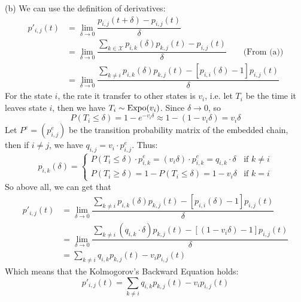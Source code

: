 \begin{homeworkProblem}
(b) We can use the definition of derivatives:
\begin{align*}
p'_{i,j}(t) &= \lim_{\delta\to 0}\dfrac{p_{i,j}(t+\delta)-p_{i,j}(t)}{\delta} \\
&= \lim_{\delta\to 0}\dfrac{\sum\limits_{k\in\mathcal{X}}p_{i,k}(\delta)p_{k,j}(t)-p_{i,j}(t)}{\delta} \qquad\text{(From (a))} \\
&= \lim_{\delta\to 0}\dfrac{\sum\limits_{k\neq i}p_{i,k}(\delta)p_{k,j}(t)-\left[p_{i,i}(\delta)-1\right]p_{i,j}(t)}{\delta}
\end{align*}
For the state $i$, the rate it transfer to other states is $v_i$, i.e. let $T_i$ be the time it leaves state $i$, then we have $T_i\sim\operatorname{Expo}(v_i)$. Since $\delta\to 0$, so
$$P(T_i\leq\delta)=1-e^{-v_i\delta}\approx 1-(1-v_i\delta)=v_i\delta$$
Let $P^e=\left(p_{i,j}^e\right)$ be the transition probability matrix of the embedded chain, then if $i\neq j$, we have $q_{i,j}=v_i\cdot p_{i,j}^e$. Thus:
$$p_{i,k}(\delta) = \begin{cases}
P(T_i\leq\delta)\cdot p_{i,k}^e = (v_i\delta)\cdot p_{i,k}^e = q_{i,k}\cdot\delta & \text{if } k\neq i \\
P(T_i\geq\delta) = 1 - P(T_i\leq\delta) = 1 - v_i\delta & \text{if } k=i
\end{cases}$$
So above all, we can get that
\begin{align*}
p'_{i,j}(t) &= \lim_{\delta\to 0}\dfrac{\sum\limits_{k\neq i}p_{i,k}(\delta)p_{k,j}(t)-\left[p_{i,i}(\delta)-1\right]p_{i,j}(t)}{\delta} \\
&= \lim_{\delta\to 0}\dfrac{\sum\limits_{k\neq i}\left(q_{i,k}\cdot\delta\right)p_{k,j}(t)-\left[\left(1 - v_i\delta\right) -1\right]p_{i,j}(t)}{\delta} \\
&= \sum_{k \neq i} q_{i, k} p_{k, j}(t)-v_i p_{i, j}(t)
\end{align*}
Which means that the Kolmogorov's Backward Equation holds:
$$p'_{i,j}(t)=\sum_{k \neq i} q_{i, k} p_{k, j}(t)-v_i p_{i, j}(t)$$


\end{homeworkProblem}
